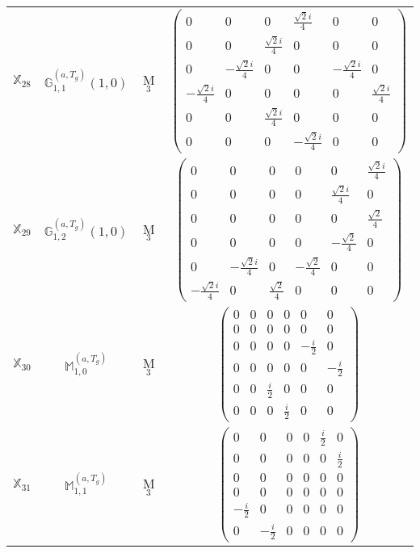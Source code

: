 \documentclass[fleqn,10pt,landscape]{article}
\begin{document}
\begin{itemize}
\begin{center}
\begin{longtable}{c|c|c|c}
$ \mathbb{X}_{28} $ & $\mathbb{G}_{1,1}^{(a,T_{g})}(1,0)$ & M$_{3}$ & $\begin{pmatrix} 0 & 0 & 0 & \frac{\sqrt{2} i}{4} & 0 & 0 \\ 0 & 0 & \frac{\sqrt{2} i}{4} & 0 & 0 & 0 \\ 0 & - \frac{\sqrt{2} i}{4} & 0 & 0 & - \frac{\sqrt{2} i}{4} & 0 \\ - \frac{\sqrt{2} i}{4} & 0 & 0 & 0 & 0 & \frac{\sqrt{2} i}{4} \\ 0 & 0 & \frac{\sqrt{2} i}{4} & 0 & 0 & 0 \\ 0 & 0 & 0 & - \frac{\sqrt{2} i}{4} & 0 & 0 \end{pmatrix}$ \\
$ \mathbb{X}_{29} $ & $\mathbb{G}_{1,2}^{(a,T_{g})}(1,0)$ & M$_{3}$ & $\begin{pmatrix} 0 & 0 & 0 & 0 & 0 & \frac{\sqrt{2} i}{4} \\ 0 & 0 & 0 & 0 & \frac{\sqrt{2} i}{4} & 0 \\ 0 & 0 & 0 & 0 & 0 & \frac{\sqrt{2}}{4} \\ 0 & 0 & 0 & 0 & - \frac{\sqrt{2}}{4} & 0 \\ 0 & - \frac{\sqrt{2} i}{4} & 0 & - \frac{\sqrt{2}}{4} & 0 & 0 \\ - \frac{\sqrt{2} i}{4} & 0 & \frac{\sqrt{2}}{4} & 0 & 0 & 0 \end{pmatrix}$ \\
$ \mathbb{X}_{30} $ & $\mathbb{M}_{1,0}^{(a,T_{g})}$ & M$_{3}$ & $\begin{pmatrix} 0 & 0 & 0 & 0 & 0 & 0 \\ 0 & 0 & 0 & 0 & 0 & 0 \\ 0 & 0 & 0 & 0 & - \frac{i}{2} & 0 \\ 0 & 0 & 0 & 0 & 0 & - \frac{i}{2} \\ 0 & 0 & \frac{i}{2} & 0 & 0 & 0 \\ 0 & 0 & 0 & \frac{i}{2} & 0 & 0 \end{pmatrix}$ \\
$ \mathbb{X}_{31} $ & $\mathbb{M}_{1,1}^{(a,T_{g})}$ & M$_{3}$ & $\begin{pmatrix} 0 & 0 & 0 & 0 & \frac{i}{2} & 0 \\ 0 & 0 & 0 & 0 & 0 & \frac{i}{2} \\ 0 & 0 & 0 & 0 & 0 & 0 \\ 0 & 0 & 0 & 0 & 0 & 0 \\ - \frac{i}{2} & 0 & 0 & 0 & 0 & 0 \\ 0 & - \frac{i}{2} & 0 & 0 & 0 & 0 \end{pmatrix}$ \\

\end{longtable}
\end{center}
\end{itemize}
\end{document}
